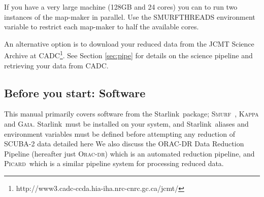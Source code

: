 \documentclass[twoside,11pt]{article}
\newcommand{\htmladdnormallink}[2]{#1}
\newcommand{\xref}[3]{#1}
\newcommand{\xlabel}[1]{}
\renewcommand{\_}{\texttt{\symbol{95}}}
\newcommand{\starlink}{\htmladdnormallink{Starlink}{http://starlink.jach.hawaii.edu}}
\newcommand{\gaia}{\xref{\textsc{Gaia}}{sun214}{}}
\newcommand{\Kappa}{\xref{\textsc{Kappa}}{sun95}{}}
\newcommand{\oracdr}{\xref{\textsc{Orac-dr}}{sun231}{}}
\newcommand{\picard}{\xref{\textsc{Picard}}{sun265}{}}
\newcommand{\smurf}{\xref{\textsc{Smurf}}{sun258}{}}
\newcommand{\smurfsun}{\xref{\textbf{SUN/258}}{sun258}{}}
\begin{document}
If you have a very large machine (128GB and 24 cores) you can to run two instances of the map-maker in parallel. Use the SMURF\_THREADS environment variable to restrict each map-maker to half the available cores.

An alternative option is to download your reduced data from the JCMT Science Archive at CADC\footnote{http://www3.cadc-ccda.hia-iha.nrc-cnrc.gc.ca/jcmt/}. See Section \ref{sec:pipe} for details on the science pipeline and retrieving your data from CADC.

\subsection{\xlabel{software}Before you start: Software}
This manual primarily covers software from the \starlink\ package;  \smurf\ \cite{smurf}, \Kappa \cite{kappa} and \gaia \cite{gaia}. \starlink\ must be installed on your system, and \starlink\ aliases and environment variables must be defined before attempting any reduction of SCUBA-2 data detailed here We also  discuss the ORAC-DR Data Reduction Pipeline (hereafter just \oracdr) which is an automated reduction pipeline, and \picard\ which is a similar pipeline system for processing reduced data.
\end{document}
